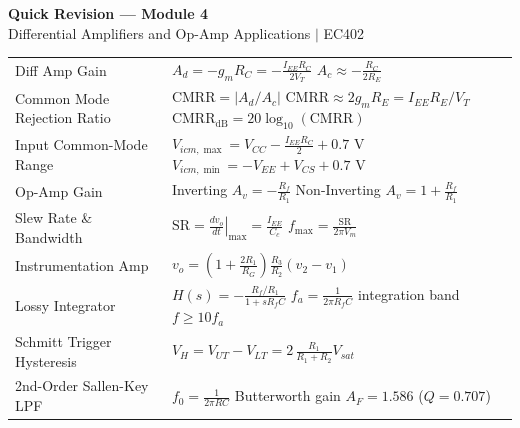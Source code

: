 \documentclass[12pt,a4paper]{article}
\renewcommand{\arraystretch}{1.45}
\begin{document}
\newpage
\begin{center}
  {\large\bfseries\color{myred} Quick Revision --- Module 4}\\[3pt]
  {\small\color{mydark} Differential Amplifiers and Op-Amp Applications $|$ EC402}
\end{center}
\noindent{\color{myred}\rule{\linewidth}{1.2pt}}
\vspace{4pt}

\begin{tcolorbox}[formulabox, title={Key Formulas at a Glance}]
\small
\renewcommand{\arraystretch}{1.35}
\setlength{\tabcolsep}{5pt}
\noindent\begin{tabularx}{\linewidth}{B{4.1cm}Y}
Diff Amp Gain & $A_d = -g_m R_C = -\frac{I_{EE} R_C}{2 V_T}$ \newline $A_c \approx -\frac{R_C}{2 R_E}$ \\[3pt]
Common Mode Rejection Ratio & $\text{CMRR} = \left|A_d/A_c\right|$ \newline $\text{CMRR} \approx 2g_m R_E = I_{EE}R_E/V_T$ \newline $\text{CMRR}_{\text{dB}} = 20\log_{10}(\text{CMRR})$ \\[3pt]
Input Common-Mode Range & $V_{icm,\max} = V_{CC} - \frac{I_{EE}R_C}{2} + 0.7\text{ V}$ \newline $V_{icm,\min} = -V_{EE} + V_{CS} + 0.7\text{ V}$ \\[3pt]
Op-Amp Gain & Inverting $A_v = -\frac{R_f}{R_1}$ \newline Non-Inverting $A_v = 1 + \frac{R_f}{R_1}$ \\[3pt]
Slew Rate \& Bandwidth & $\text{SR} = \left.\frac{dv_o}{dt}\right|_{\max} = \frac{I_{EE}}{C_c}$ \newline $f_{\max} = \frac{\text{SR}}{2\pi V_m}$ \\[3pt]
Instrumentation Amp & $v_o = \left(1 + \frac{2 R_1}{R_G}\right)\frac{R_3}{R_2}(v_2 - v_1)$ \\[3pt]
Lossy Integrator & $H(s) = -\frac{R_f/R_1}{1 + s R_f C}$ \newline $f_a = \frac{1}{2\pi R_f C}$ \newline integration band $f \ge 10 f_a$ \\[3pt]
Schmitt Trigger Hysteresis & $V_H = V_{UT} - V_{LT} = 2\,\frac{R_1}{R_1 + R_2} V_{sat}$ \\[3pt]
2nd-Order Sallen-Key LPF & $f_0 = \frac{1}{2\pi RC}$ \newline Butterworth gain $A_F = 1.586$ ($Q = 0.707$)
\end{tabularx}\par
\end{tcolorbox}
\end{document}
